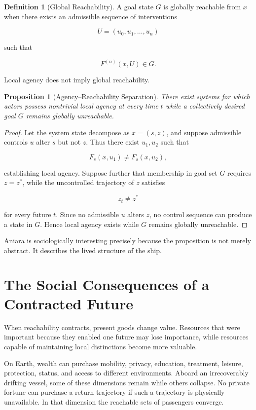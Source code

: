 \documentclass[11pt,oneside]{book}
\newtheorem{proposition}[theorem]{Proposition}
\theoremstyle{definition}
\newtheorem{definition}[theorem]{Definition}
\theoremstyle{remark}
\begin{document}
\begin{definition}[Global Reachability]
A goal state \(G\) is globally reachable from \(x\) when there exists an admissible sequence of interventions

\[
U=(u_0,u_1,\ldots,u_n)
\]

such that

\[
F^{(n)}(x,U)\in G.
\]
\end{definition}

Local agency does not imply global reachability.

\begin{proposition}[Agency--Reachability Separation]
There exist systems for which actors possess nontrivial local agency at every time \(t\) while a collectively desired goal \(G\) remains globally unreachable.
\end{proposition}

\begin{proof}
Let the system state decompose as \(x=(s,z)\), and suppose admissible controls \(u\) alter \(s\) but not \(z\). Thus there exist \(u_1,u_2\) such that

\[
F_s(x,u_1)\neq F_s(x,u_2),
\]

establishing local agency. Suppose further that membership in goal set \(G\) requires \(z=z^\ast\), while the uncontrolled trajectory of \(z\) satisfies

\[
z_t\neq z^\ast
\]

for every future \(t\). Since no admissible \(u\) alters \(z\), no control sequence can produce a state in \(G\). Hence local agency exists while \(G\) remains globally unreachable.
\end{proof}

Aniara is sociologically interesting precisely because the proposition is not merely abstract. It describes the lived structure of the ship.

\section{The Social Consequences of a Contracted Future}

When reachability contracts, present goods change value. Resources that were important because they enabled one future may lose importance, while resources capable of maintaining local distinctions become more valuable.

On Earth, wealth can purchase mobility, privacy, education, treatment, leisure, protection, status, and access to different environments. Aboard an irrecoverably drifting vessel, some of these dimensions remain while others collapse. No private fortune can purchase a return trajectory if such a trajectory is physically unavailable. In that dimension the reachable sets of passengers converge.
\end{document}
